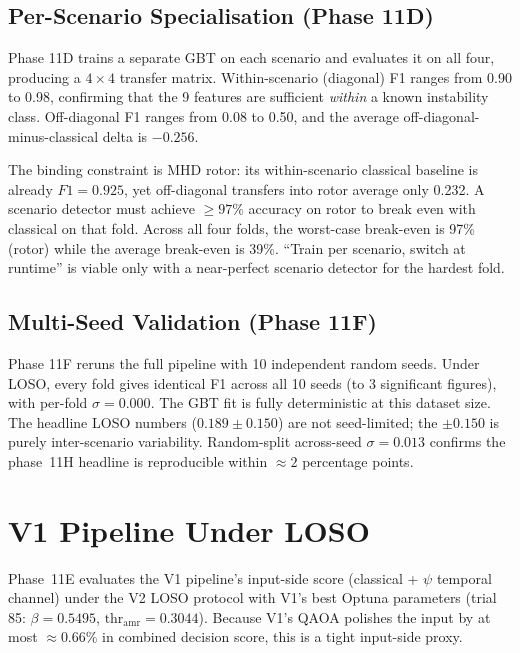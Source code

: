 \documentclass[12pt, a4paper, oneside]{report}
\begin{document}
\subsection{Per-Scenario Specialisation (Phase 11D)}

Phase 11D trains a separate GBT on each scenario and evaluates it on all four, producing a $4 \times 4$ transfer matrix. Within-scenario (diagonal) F1 ranges from 0.90 to 0.98, confirming that the 9 features are sufficient \textit{within} a known instability class. Off-diagonal F1 ranges from 0.08 to 0.50, and the average off-diagonal-minus-classical delta is $-0.256$.

The binding constraint is MHD rotor: its within-scenario classical baseline is already $F1 = 0.925$, yet off-diagonal transfers into rotor average only 0.232. A scenario detector must achieve $\geq 97\%$ accuracy on rotor to break even with classical on that fold. Across all four folds, the worst-case break-even is 97\% (rotor) while the average break-even is 39\%. ``Train per scenario, switch at runtime'' is viable only with a near-perfect scenario detector for the hardest fold.

\subsection{Multi-Seed Validation (Phase 11F)}

Phase 11F reruns the full pipeline with 10 independent random seeds. Under LOSO, every fold gives identical F1 across all 10 seeds (to 3 significant figures), with per-fold $\sigma = 0.000$. The GBT fit is fully deterministic at this dataset size. The headline LOSO numbers ($0.189 \pm 0.150$) are not seed-limited; the $\pm 0.150$ is purely inter-scenario variability. Random-split across-seed $\sigma = 0.013$ confirms the phase~11H headline is reproducible within $\approx 2$ percentage points.

\section{V1 Pipeline Under LOSO}
\label{sec:v1-loso}

Phase~11E evaluates the V1 pipeline's input-side score (classical + $\psi$ temporal channel) under the V2 LOSO protocol with V1's best Optuna parameters (trial 85: $\beta = 0.5495$, $\text{thr}_\text{amr} = 0.3044$). Because V1's QAOA polishes the input by at most $\approx 0.66\%$ in combined decision score, this is a tight input-side proxy.
\end{document}
